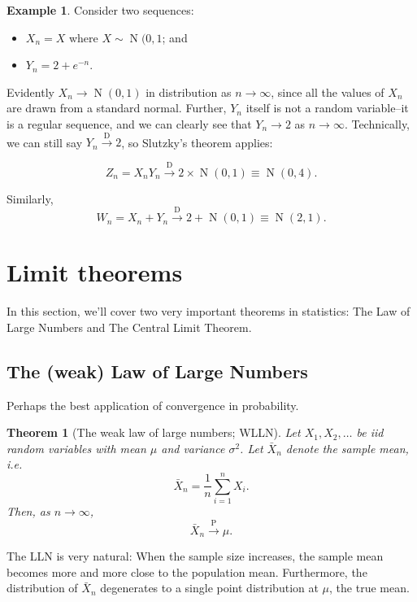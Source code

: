 \documentclass[
]{book}
\providecommand{\tightlist}{%
  \setlength{\itemsep}{0pt}\setlength{\parskip}{0pt}}
\DeclareMathOperator{\N}{N}
\newtheorem{theorem}{Theorem}[chapter]
\theoremstyle{definition}
\theoremstyle{definition}
\newtheorem{example}{Example}[chapter]
\theoremstyle{definition}
\theoremstyle{definition}
\theoremstyle{remark}
\begin{document}
\begin{example}
Consider two sequences:

\begin{itemize}
\tightlist
\item
  \(X_n = X\) where \(X\sim\N(0,1\); and
\item
  \(Y_n = 2 + e^{-n}\).
\end{itemize}

Evidently \(X_n \to \N(0,1)\) in distribution as \(n\to\infty\), since all the values of \(X_n\) are drawn from a standard normal.
Further, \(Y_n\) itself is not a random variable--it is a regular sequence, and we can clearly see that \(Y_n \to 2\) as \(n\to\infty\).
Technically, we can still say \(Y_n{\xrightarrow{\text{D}}} 2\), so Slutzky's theorem applies:

\[
Z_n = X_nY_n \xrightarrow{\text{D}} 2 \times \N(0,1) \equiv \N(0,4).
\]

Similarly,
\[
W_n = X_n + Y_n \xrightarrow{\text{D}} 2 + \N(0,1) \equiv \N(2,1).
\]
\end{example}

\hypertarget{limit-theorems}{%
\section{Limit theorems}\label{limit-theorems}}

In this section, we'll cover two very important theorems in statistics: The Law of Large Numbers and The Central Limit Theorem.

\hypertarget{the-weak-law-of-large-numbers}{%
\subsection{The (weak) Law of Large Numbers}\label{the-weak-law-of-large-numbers}}

Perhaps the best application of convergence in probability.

\begin{theorem}[The weak law of large numbers; WLLN]
Let \(X_1,X_2,\dots\) be iid random variables with mean \(\mu\) and variance \(\sigma^2\).
Let \(\bar X_n\) denote the sample mean, i.e.~\[\bar X_n = \frac{1}{n}\sum_{i=1}^n X_i.\]
Then, as \(n\to\infty\),
\[\bar X_n{\xrightarrow{\text{P}}} \mu.\]
\end{theorem}

The LLN is very natural: When the sample size increases, the sample mean
becomes more and more close to the population mean. Furthermore, the
distribution of \(\bar X_n\) degenerates to a single point distribution at \(\mu\), the true mean.
\end{document}

